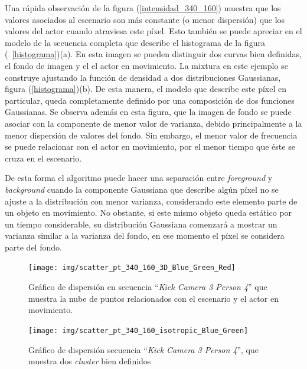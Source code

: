 Una rápida observación de la figura (\ref{intensidad_340_160}) muestra que los valores asociados al escenario son más constante (o menor dispersión) que los valores del actor cuando atraviesa este píxel. Esto también se puede apreciar en el modelo de la secuencia completa que describe el histograma de la figura (~\ref{histograma})(a). En esta imagen se pueden distinguir dos curvas bien definidas, el fondo de imagen y el el actor en movimiento. La mixtura en este ejemplo se construye ajustando la función de densidad a dos distribuciones Gaussianas, figura (\ref{histograma})(b). De esta manera, el modelo que describe este píxel en particular, queda completamente definido por una composición de dos funciones Gaussianas. Se observa además en esta figura, que la imagen de fondo se puede asociar con la componente de menor valor de varianza, debido principalmente a la menor dispersión de valores del fondo. Sin embargo, el menor valor de frecuencia se puede relacionar con el actor en movimiento, por el menor tiempo que éste se cruza en el escenario. 

De esta forma el algoritmo puede hacer una separación entre \textit{foreground} y \textit{background}  cuando la componente Gaussiana que describe algún píxel no se ajuste a la distribución con menor varianza, considerando este elemento parte de un objeto en movimiento. No obstante, si este mismo objeto queda estático por un tiempo considerable, su distribución Gaussiana comenzará a mostrar un varianza similar a la varianza del fondo, en ese momento el píxel se considera parte del fondo.




\begin{figure}[h!]
  \centering
      \texttt{[image: img/scatter\_pt\_340\_160\_3D\_Blue\_Green\_Red]}
  \caption[Gráfico dispersión 3D secuencia completa ``\textit{Kick Camera 3 Person 4}'']{Gráfico de dispersión en secuencia ``\textit{Kick Camera 3 Person 4}'' que muestra la nube de puntos relacionados con el escenario y el actor en movimiento.}
\label{scatter_3D}
\end{figure}

\begin{figure}[h!]
  \centering
      \texttt{[image: img/scatter\_pt\_340\_160\_isotropic\_Blue\_Green]}
  \caption[Gráfico dispersión 2D secuencia completa ``\textit{Kick Camera 3 Person 4}'']{Gráfico de dispersión secuencia ``\textit{Kick Camera 3 Person 4}'', que muestra dos \textit{cluster} bien definidos}
\label{scatter_2D}
\end{figure}

